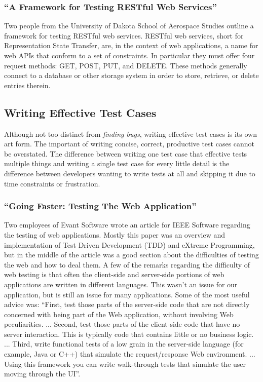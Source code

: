 \documentclass[11pt]{article}
\begin{document}
\subsubsection{``A Framework for Testing RESTful Web Services'' \cite{RESTfulFramework}}
Two people from the University of Dakota School of Aerospace Studies outline a framework for testing RESTful web services. RESTful web services, short for Representation State Transfer, are, in the context of web applications, a name for web APIs that conform to a set of constraints. In particular they must offer four request methods: GET, POST, PUT, and DELETE. These methods generally connect to a database or other storage system in order to store, retrieve, or delete entries therein.


\subsection{Writing Effective Test Cases}
Although not too distinct from \emph{finding bugs}, writing effective test cases is its own art form. The important of writing concise, correct, productive test cases cannot be overstated. The difference between writing one test case that effective tests multiple things and writing a single test case for every little detail is the difference between developers wanting to write tests at all and skipping it due to time constraints or frustration.

\subsubsection{``Going Faster: Testing The Web Application'' \cite{GoingFaster}}
Two employees of Evant Software wrote an article for IEEE Software regarding the testing of web applications. Mostly this paper was an overview and implementation of Test Driven Development (TDD) and eXtreme Programming, but in the middle of the article was a good section about the difficulties of testing the web and how to deal them. A few of the remarks regarding the difficulty of web testing is that often the client-side and server-side portions of web applications are written in different languages. This wasn't an issue for our application, but is still an issue for many applications. Some of the most useful advice was: ``First, test those parts of the server-side code that are not directly concerned with being part of the Web application, without involving Web peculiarities. ... Second, test those parts of the client-side code that have no server interaction. This is typically code that contains little or no business logic. ... Third, write functional tests of a low grain in the server-side language (for example, Java or C++) that simulate the request/response Web environment. ... Using this framework you can write walk-through tests that simulate the user moving through the UI''.
\end{document}
